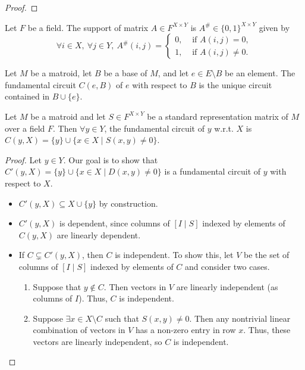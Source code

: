 \begin{proof}
    \leanok
    \SeeLean
\end{proof}


\begin{definition}
    \label{def:support_matrix}
    \leanok
    Let $F$ be a field. The support of matrix $A \in F^{X \times Y}$ is $A^{\#} \in \{0, 1\}^{X \times Y}$ given by
    \[
        \forall i \in X, \ \forall j \in Y, \ A^{\#} (i, j) = \begin{cases}
            0, & \text{ if } A (i, j) = 0, \\
            1, & \text{ if } A (i, j) \neq 0.
        \end{cases}
    \]
\end{definition}

\begin{definition}
    \label{def:fund_circuit}
    \leanok
    Let $M$ be a matroid, let $B$ be a base of $M$, and let $e \in E \setminus B$ be an element. The fundamental circuit $C (e, B)$ of $e$ with respect to $B$ is the unique circuit contained in $B \cup \{e\}$.
\end{definition}

\begin{lemma}
    \label{lem:std_repr_fund_circuits}
    \leanok
    Let $M$ be a matroid and let $S \in F^{X \times Y}$ be a standard representation matrix of $M$ over a field $F$. Then $\forall y \in Y$, the fundamental circuit of $y$ w.r.t. $X$ is $C (y, X) = \{y\} \cup \{x \in X \mid S (x, y) \neq 0\}$.
\end{lemma}

\begin{proof}
    \leanok
    Let $y \in Y$. Our goal is to show that $C' (y, X) = \{y\} \cup \{x \in X \mid D (x, y) \neq 0\}$ is a fundamental circuit of $y$ with respect to $X$.
    \begin{itemize}
        \item $C' (y, X) \subseteq X \cup \{y\}$ by construction.
        \item $C' (y, X)$ is dependent, since columns of $[I \mid S]$ indexed by elements of $C (y, X)$ are linearly dependent.
        \item If $C \subsetneq C' (y, X)$, then $C$ is independent. To show this, let $V$ be the set of columns of $[I \mid S]$ indexed by elements of $C$ and consider two cases.
        \begin{enumerate}
            \item Suppose that $y \notin C$. Then vectors in $V$ are linearly independent (as columns of $I$). Thus, $C$ is independent.
            \item Suppose $\exists x \in X \setminus C$ such that $S (x, y) \neq 0$. Then any nontrivial linear combination of vectors in $V$ has a non-zero entry in row $x$. Thus, these vectors are linearly independent, so $C$ is independent.
        \end{enumerate}
    \end{itemize}
\end{proof}

